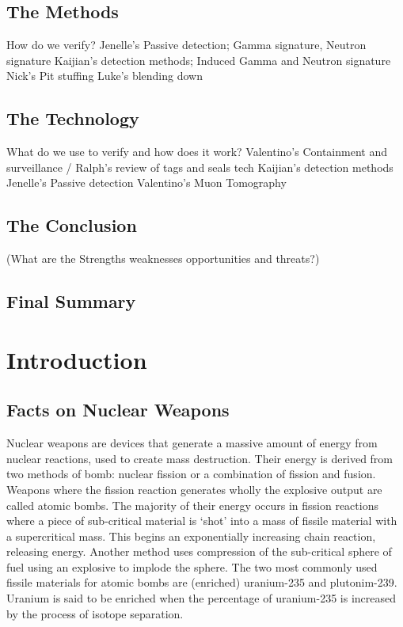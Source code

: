 \documentclass[a4paper]{article}
\begin{document}
\subsection*{The Methods}
How do we verify?
Jenelle's Passive detection; Gamma signature, Neutron signature
Kaijian's detection methods; Induced Gamma and Neutron signature 
Nick's Pit stuffing
Luke's blending down
\subsection*{The Technology}
What do we use to verify and how does it work?
Valentino's Containment and surveillance / Ralph's review of tags and seals tech
Kaijian's detection methods
Jenelle's Passive detection
Valentino's Muon Tomography 

\subsection*{The Conclusion}
(What are the Strengths weaknesses opportunities and threats?)
\subsection*{Final Summary}

\tableofcontents

\section{Introduction}

\subsection{Facts on Nuclear Weapons}
Nuclear weapons are devices that generate a massive amount of energy 
from nuclear reactions, used to create mass destruction. Their energy 
is derived from two methods of bomb: nuclear fission or a combination 
of fission and fusion. Weapons where the fission reaction generates 
wholly the explosive output are called atomic bombs. The majority of 
their energy occurs in fission reactions where a piece of sub-critical 
material is ‘shot’ into a mass of fissile material with a supercritical 
mass. This begins an exponentially increasing chain reaction, releasing 
energy. Another method uses compression of the sub-critical sphere of 
fuel using an explosive to implode the sphere. The two most commonly 
used fissile materials for atomic bombs are (enriched) uranium-235 and 
plutonim-239. Uranium is said to be enriched when the percentage of 
uranium-235 is increased by the process of isotope separation.
\end{document}
